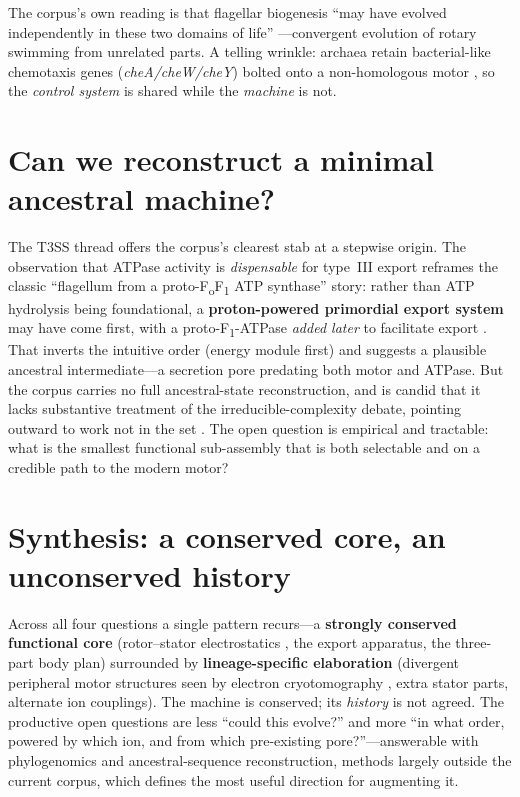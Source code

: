 \documentclass[11pt,letterpaper]{article}
\begin{document}
The corpus's own reading is that flagellar biogenesis ``may have evolved independently in these two
domains of life'' \cite{Thomas-2002}---convergent evolution of rotary swimming from
unrelated parts. A telling wrinkle: archaea retain bacterial-like chemotaxis genes
(\emph{cheA/cheW/cheY}) bolted onto a non-homologous motor \cite{Thomas-2001}, so the
\emph{control system} is shared while the \emph{machine} is not.

\section{Can we reconstruct a minimal ancestral machine?}
The T3SS thread offers the corpus's clearest stab at a stepwise origin. The observation that ATPase
activity is \emph{dispensable} for type~III export \cite{Erhardt-2014} reframes the classic
``flagellum from a proto-F\textsubscript{o}F\textsubscript{1} ATP synthase'' story: rather than ATP
hydrolysis being foundational, a \textbf{proton-powered primordial export system} may have come first,
with a proto-F\textsubscript{1}-ATPase \emph{added later} to facilitate export
\cite{Erhardt-2014}. That inverts the intuitive order (energy module first) and suggests a
plausible ancestral intermediate---a secretion pore predating both motor and ATPase. But the corpus
carries no full ancestral-state reconstruction, and is candid that it lacks substantive treatment of
the irreducible-complexity debate, pointing outward to work not in the set \cite{Sowa-2008-b}.
The open question is empirical and tractable: what is the smallest functional sub-assembly that is both
selectable and on a credible path to the modern motor?

\section{Synthesis: a conserved core, an unconserved history}
Across all four questions a single pattern recurs---a \textbf{strongly conserved functional core}
(rotor--stator electrostatics \cite{Berry-1993,Yakushi-2006}, the export apparatus, the
three-part body plan) surrounded by \textbf{lineage-specific elaboration} (divergent peripheral motor
structures seen by electron cryotomography \cite{Sowa-2008-b}, extra stator parts,
alternate ion couplings). The machine is conserved; its \emph{history} is not agreed. The productive
open questions are less ``could this evolve?'' and more ``in what order, powered by which ion, and from
which pre-existing pore?''---answerable with phylogenomics and ancestral-sequence reconstruction, methods
largely outside the current corpus, which defines the most useful direction for augmenting it.
\end{document}
